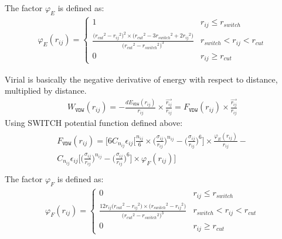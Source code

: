 \documentclass[letterpaper,10pt,english]{sphinxmanual}
\begin{document}
\begin{description}
The factor \(\varphi_E\) is defined as:
\begin{equation*}
\begin{split}\varphi_E(r_{ij}) =
\begin{cases}
  1 & r_{ij} \leq r_{switch} \\
  \frac{\big({r_{cut}}^2 - {r_{ij}}^2 \big)^2 \times \big({r_{cut}}^2 - 3{r_{switch}}^2 + 2{r_{ij}}^2 \big)}{\big({r_{cut}}^2 - {r_{switch}}^2 \big)^3} & r_{switch} < r_{ij} < r_{cut} \\
  0 & r_{ij} \geq r_{cut}
\end{cases}\end{split}
\end{equation*}
\item[{\sphinxcode{\sphinxupquote{Virial Calculation}}}] \leavevmode
Virial is basically the negative derivative of energy with respect to distance, multiplied by distance.
\begin{equation*}
\begin{split}W_{\texttt{VDW}}(r_{ij}) = -\frac{dE_{\texttt{VDW}}(r_{ij})}{r_{ij}}\times \frac{\overrightarrow{r_{ij}}}{{r_{ij}}} = F_{\texttt{VDW}}(r_{ij}) \times \frac{\overrightarrow{r_{ij}}}{{r_{ij}}}\end{split}
\end{equation*}
Using SWITCH potential function defined above:
\begin{align*}\!\begin{aligned}
F_{\texttt{VDW}}(r_{ij}) = \Bigg[6 C_{n_{ij}} \epsilon_{ij} \bigg[\frac{n_{ij}}{6} \times \bigg(\frac{\sigma_{ij}}{r_{ij}}\bigg)^{n_{ij}} - \bigg(\frac{\sigma_{ij}}{r_{ij}}\bigg)^6\bigg]\times \frac{\varphi_E(r_{ij})}{{r_{ij}}}  -\\
C_{n_{ij}} \epsilon_{ij} \bigg[\bigg(\frac{\sigma_{ij}}{r_{ij}}\bigg)^{n_{ij}} - \bigg(\frac{\sigma_{ij}}{r_{ij}}\bigg)^6\bigg] \times \varphi_F(r_{ij}) \Bigg]\\
\end{aligned}\end{align*}
The factor \(\varphi_F\) is defined as:
\begin{equation*}
\begin{split}\varphi_F(r_{ij}) =
\begin{cases}
  0 & r_{ij} \leq r_{switch} \\
  \frac{12r_{ij}\big({r_{cut}}^2 - {r_{ij}}^2 \big) \times \big({r_{switch}}^2 - {r_{ij}}^2 \big)}{\big({r_{cut}}^2 - {r_{switch}}^2 \big)^3} & r_{switch} < r_{ij} < r_{cut} \\
  0 & r_{ij} \geq r_{cut}
\end{cases}\end{split}
\end{equation*}
\begin{figure}[htbp]
\centering
\capstart


\end{figure}
\end{description}
\end{document}
